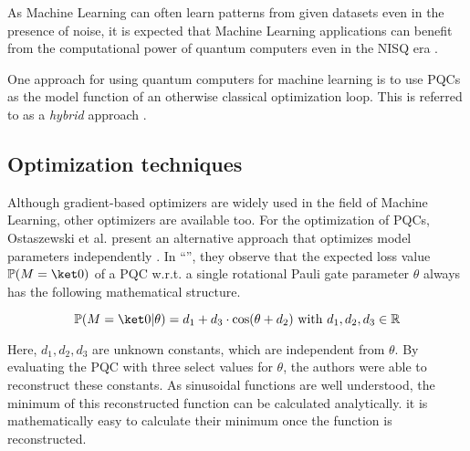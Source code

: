 As Machine Learning can often learn patterns from given datasets even in the
presence of noise, it is expected that Machine Learning applications can benefit
from the computational power of quantum computers even in the NISQ era
\cite{ciliberto_quantum_2018,cerezo_variational_2021}.

One approach for using quantum computers for machine learning is to use
PQCs as the model function of an otherwise classical optimization loop.
This is referred to as a \emph{hybrid} approach
\cite{benedetti_parameterized_2019,mitarai_quantum_2018}.


\subsection{Optimization techniques}
\label{sec:optimizers}

Although gradient-based optimizers are widely used in the field of Machine
Learning, other optimizers are available too.
For the optimization of PQCs, Ostaszewski et al. present an alternative approach
that optimizes model parameters independently \cite{ostaszewski_structure_2021}.
In ``\emph{}'', they observe that
the expected loss value $\mathbb P(M = \ket 0)$ of a PQC w.r.t. a single
rotational Pauli gate parameter $\theta$ always has the following mathematical
structure.

\begin{equation}
    \mathbb{P}(M = \ket 0 | \theta) = d_1 + d_3 \cdot \cos(\theta + d_2)
    \text{ with } d_1,d_2,d_3 \in \mathbb R
\end{equation}

Here, $d_1, d_2, d_3$ are unknown constants, which are independent from
$\theta$.
By evaluating the PQC with three select values for $\theta$, the authors were
able to reconstruct these constants.
As sinusoidal functions are well understood, the minimum of this reconstructed
function can be calculated analytically. it is mathematically easy to
calculate their minimum once the function is reconstructed.
